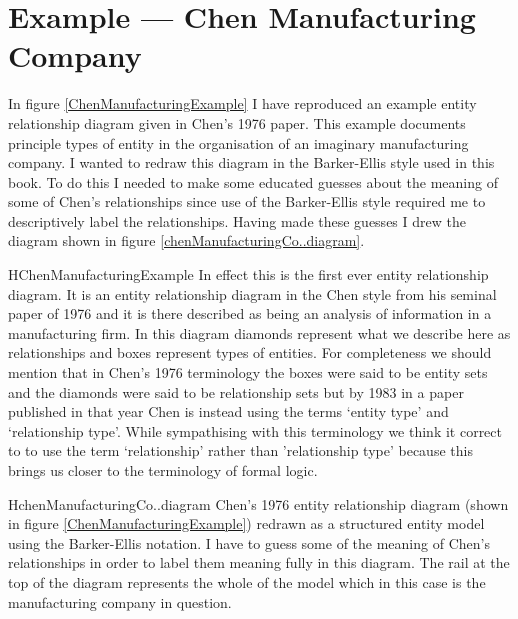 \section{Example --- Chen Manufacturing Company}
\label{ChenManufacturingCompany}
In figure \ref{ChenManufacturingExample} I have reproduced an example entity relationship diagram  given in Chen's 1976 paper. This example documents principle types of entity in the organisation of an imaginary manufacturing company.  I wanted to redraw
this diagram in the Barker-Ellis style used in this book. To do this I needed to make some educated guesses about the meaning of some of Chen's relationships since use of the Barker-Ellis style  required me to descriptively label the relationships. Having made these guesses I drew the diagram shown
 in figure \ref{chenManufacturingCo..diagram}. 

\begin{erboxedFigure} {H}{ChenManufacturingExample}{
In effect this is the first ever entity relationship diagram. It is an entity relationship diagram in the Chen style from his seminal paper of 1976 and it is there described as being an analysis of information in a manufacturing firm. In this diagram
diamonds represent what we describe here as relationships and boxes represent types of entities.  
For completeness we should mention that in Chen's 1976 terminology the boxes were said to be entity sets and the diamonds were said to be relationship sets but by 1983 in a paper published in that year Chen is instead using the terms `entity type' and `relationship type'. While sympathising with this terminology we think it correct to to use the term `relationship' rather than 'relationship type' because this brings us closer to the terminology of formal logic.
}
\begin{center}
\scalebox{0.80}{}
\end{center}
\end{erboxedFigure}

\begin{erboxedFigure} {H}{chenManufacturingCo..diagram}{
Chen's 1976 entity relationship diagram (shown in figure \ref{ChenManufacturingExample}) 
redrawn as a structured entity model using the Barker-Ellis notation. 
I have to guess some of the meaning of Chen's relationships in order to label them meaning fully in
 this diagram. 
 The rail at the top of the diagram represents the whole of the model which in this case is the manufacturing company in question.
}
\begin{center}
\scalebox{0.95}{}
\end{center}
\end{erboxedFigure}


